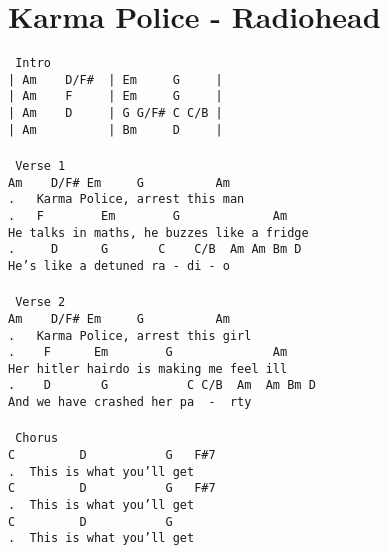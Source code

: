 \newpage
\section{Karma Police - Radiohead}
\label{Karma Police - Radiohead}
\texttt{\lbrack\ Intro\rbrack\\
|\ Am\ \ \ \ D/F\#\ \ |\ Em\ \ \ \ \ G\ \ \ \ \ |\\
|\ Am\ \ \ \ F\ \ \ \ \ |\ Em\ \ \ \ \ G\ \ \ \ \ |\\
|\ Am\ \ \ \ D\ \ \ \ \ |\ G\ G/F\#\ C\ C/B\ |\\
|\ Am\ \ \ \ \ \ \ \ \ \ |\ Bm\ \ \ \ \ D\ \ \ \ \ |\\
\\
\lbrack\ Verse\ 1\rbrack\\
Am\ \ \ \ D/F\#\ Em\ \ \ \ \ G\ \ \ \ \ \ \ \ \ \ Am\\
. \ \ Karma\ Police,\ arrest\ this\ man\\
. \ \ F\ \ \ \ \ \ \ \ Em\ \ \ \ \ \ \ \ G\ \ \ \ \ \ \ \ \ \ \ \ \ Am\\
He\ talks\ in\ maths,\ he\ buzzes\ like\ a\ fridge\\
. \ \ \ \ D\ \ \ \ \ \ G\ \ \ \ \ \ \ C\ \ \ \ C/B\ \ Am\ Am\ Bm\ D\\
He's\ like\ a\ detuned\ ra\ -\ di\ -\ o\\
\\
\lbrack\ Verse\ 2\rbrack\\
Am\ \ \ \ D/F\#\ Em\ \ \ \ \ G\ \ \ \ \ \ \ \ \ \ Am\\
. \ \ Karma\ Police,\ arrest\ this\ girl\\
. \ \ \ F\ \ \ \ \ \ Em\ \ \ \ \ \ \ \ G\ \ \ \ \ \ \ \ \ \ \ \ \ \ Am\\
Her\ hitler\ hairdo\ is\ making\ me\ feel\ ill\\
. \ \ \ D\ \ \ \ \ \ \ G\ \ \ \ \ \ \ \ \ \ \ C\ C/B\ \ Am\ \ Am\ Bm\ D\\
And\ we\ have\ crashed\ her\ pa\ \ -\ \ rty\\
\\
\lbrack\ Chorus\rbrack\\
C\ \ \ \ \ \ \ \ \ D\ \ \ \ \ \ \ \ \ \ \ G\ \ \ F\#7\\
. \ This\ is\ what\ you'll\ get\\
C\ \ \ \ \ \ \ \ \ D\ \ \ \ \ \ \ \ \ \ \ G\ \ \ F\#7\\
. \ This\ is\ what\ you'll\ get\\
C\ \ \ \ \ \ \ \ \ D\ \ \ \ \ \ \ \ \ \ \ G\\
. \ This\ is\ what\ you'll\ get\\
}
